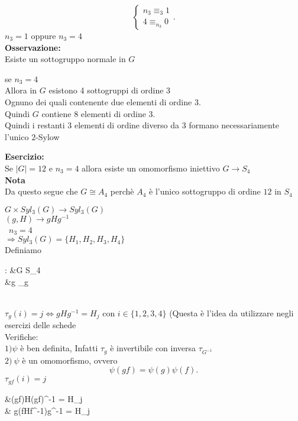 \documentclass[12px]{article}
\begin{document}
{\[\begin{cases}
	 n_3\equiv_3 1\\
	 4\equiv_{n_3} 0
		  \end{cases}
	 .\] 
	 $n_3 = 1$ oppure $n_3 = 4$\\
	  \textbf{Osservazione:}\\
	  Esiste un sottogruppo normale in $G$
	  \begin{dimo}
	  	se $n_3 = 4$\\
		Allora in  $G$ esistono 4 sottogruppi di ordine 3\\
		Ognuno dei quali contenente due elementi di ordine 3.\\
		Quindi $G$ contiene 8 elementi di ordine 3.\\
		Quindi i restanti 3 elementi di ordine diverso da 3 formano necessariamente l'unico $2$-Sylow
	  \end{dimo}
	  \textbf{Esercizio:}\\
	  Se $|G| = 12$ e  $n_3 = 4$ allora esiste un omomorfismo iniettivo  $G \rightarrow S_4$\\
	  \textbf{Nota}\\
	  Da questo segue che $G\cong A_4$ perchè $A_4$ è l'unico sottogruppo di ordine $12$ in $S_4$
	  \begin{dimo}
	  	$G\times Syl_3(G) \rightarrow Syl_3(G)$\\
		$(g,H) \rightarrow g H g^{-1}$\\\
		$n_3 = 4$\\
		$ \Rightarrow Syl_3(G) = \{H_1,H_2,H_3,H_4\}$ \\
		Definiamo\\
		\begin{aligend}
			\psi : &G \rightarrow S_4\\
			       &g \rightarrow \tau_g
		\end{aligend}\\
		$\tau_g(i) = j \Leftrightarrow gHg^{-1} = H_j$ con $i\in\{1,2,3,4\}$ (Questa è l'idea da utilizzare negli esercizi delle schede\\
Verifiche:\\
$1) \psi$ è ben definita, Infatti $\tau_g$ è invertibile con inversa  $\tau_{G^{-1}}$\\
 $2) \ \psi $ è un omomorfismo, ovvero
 \[
 \psi(gf) = \psi(g)\psi(f)
 .\] 
 $\tau_{gf}(i) = j$ \\\begin{aligned}
	\Leftrightarrow&(gf)H(gf)^{-1} = H_j\\
	\Leftrightarrow& g(fHf^{-1})g^{-1} = H_j\\

\end{aligned}
\end{dimo}}
\end{document}

